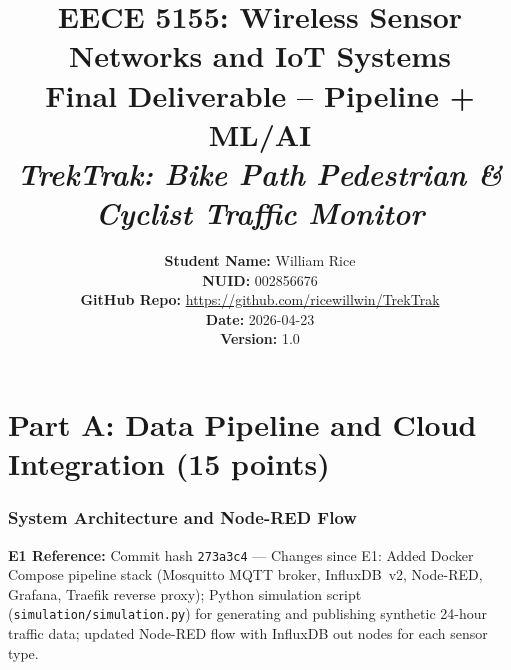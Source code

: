 \documentclass[11pt]{article}
\title{%
    \textbf{EECE 5155: Wireless Sensor Networks and IoT Systems}\\[0.5em]
    \Large Final Deliverable -- Pipeline + ML/AI\\[1em]
    \large \textit{TrekTrak: Bike Path Pedestrian \& Cyclist Traffic Monitor}
}
\author{%
    \textbf{Student Name:} William Rice\\
    \textbf{NUID:} 002856676\\
    \textbf{GitHub Repo:} \url{https://github.com/ricewillwin/TrekTrak}\\
    \textbf{Date:} 2026-04-23\\
    \textbf{Version:} 1.0
}
\date{}
\begin{document}
\maketitle
\thispagestyle{fancy}

%
%

\part*{Part A: Data Pipeline and Cloud Integration (15 points)}

\section{System Architecture and Node-RED Flow}
\label{sec:architecture}

\noindent\textbf{E1 Reference:} Commit hash \texttt{273a3c4} --- Changes since E1: Added Docker Compose pipeline stack (Mosquitto MQTT broker, InfluxDB~v2, Node-RED, Grafana, Traefik reverse proxy); Python simulation script (\texttt{simulation/simulation.py}) for generating and publishing synthetic 24-hour traffic data; updated Node-RED flow with InfluxDB out nodes for each sensor type.

\vspace{0.5em}
\end{document}
